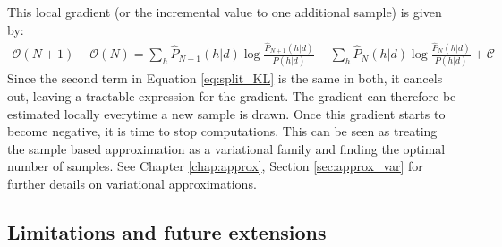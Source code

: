 This local gradient (or the incremental value to one additional sample) is given by:
\begin{align}
\mathcal{O}(N + 1) - \mathcal{O}(N) =  \sum_h \hat{P}_{N+1}(h|d) \log \frac{\hat{P}_{N+1}(h|d)}{P(h|d)} -  \sum_h \hat{P}_N(h|d) \log \frac{\hat{P}_N(h|d)}{P(h|d)} + \mathcal{C}
\end{align}
Since the second term in Equation \ref{eq:split_KL} is the same in both, it cancels out, leaving a tractable expression for the gradient. The gradient can therefore be estimated locally everytime a new sample is drawn. Once this gradient starts to become negative, it is time to stop computations. This can be seen as treating the sample based approximation as a variational family and finding the optimal number of samples\cite{saeedi17}. See Chapter \ref{chap:approx}, Section \ref{sec:approx_var} for further details on variational approximations.

\subsection{Limitations and future extensions}



